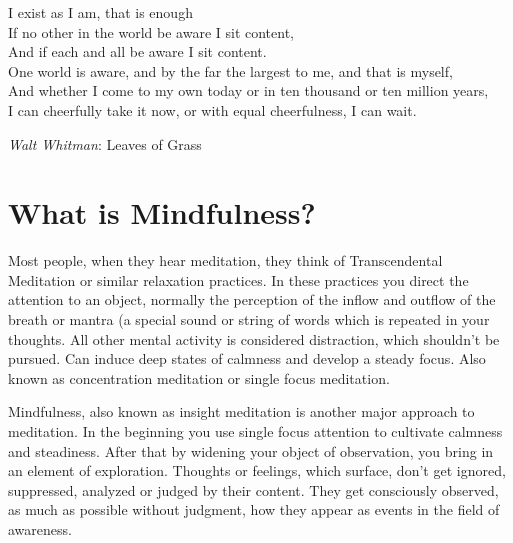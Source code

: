 \documentclass[../Book.Stress_regulation.tex]{subfiles}
\begin{document}
\setlength{}

 \epigraph{I exist as I am, that is enough \\
If no other in the world be aware I sit content,\\
And if each and all be aware I sit content.\\
One world is aware, and by the far the largest to me, and that is myself,\\
And whether I come to my own today or in ten thousand or ten million years,\\
I can cheerfully take it now, or with equal cheerfulness, I can wait.}{\textit{Walt Whitman}: Leaves of Grass}
\setlength{}
\section{What is Mindfulness?}

Most people, when they hear meditation, they think of {Transcendental Meditation\texttrademark} or similar relaxation practices.
In these practices you  {direct the attention to an object}, normally the perception of the inflow and outflow of the {breath or mantra} (a special sound or string of words which is repeated in your thoughts.
All other mental activity is considered {distraction}, which shouldn't be pursued.
Can induce deep states of {calmness} and {develop a steady focus}.
Also known as concentration meditation or {single focus meditation}.   

Mindfulness, also known as {insight meditation} is another major approach to meditation.
In the beginning you use single focus attention to cultivate calmness and steadiness.
After that by {widening your object of observation}, you bring in an element of exploration.
{Thoughts or feelings}, which surface, don't get ignored, suppressed, analyzed or judged by their content.
They get consciously {observed}, as much as possible {without judgment}, how they appear as events in the field of awareness.
\end{document}
